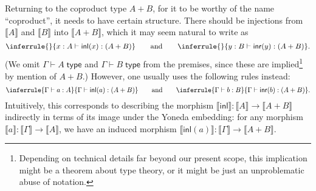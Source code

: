 \documentclass[10pt]{article}
\def\ty{\;\mathsf{type}}
\def\m#1{\llbracket#1\rrbracket}
\def\inl{\mathsf{inl}}
\def\inr{\mathsf{inr}}
\def\types{\vdash}
\numberwithin{equation}{section}
\begin{document}
Returning to the coproduct type $A+B$, for it to be worthy of the name ``coproduct'', it needs to have certain structure.
There should be injections from $\m A$ and $\m B$ into $\m {A+B}$, which %
it may seem natural to write as
\begin{equation}
  \inferrule{ }{x:A\types \inl(x) :(A+B)}
  \qquad \text{and}\qquad
  \inferrule{ }{y:B\types \inr(y) :(A+B)}.\label{eq:inl-nocut}
\end{equation}
(We omit $\Gamma \types A\ty$ and $\Gamma\types B\ty$ from the premises, since these are implied\footnote{Depending on technical details far beyond our present scope, this implication might be a theorem about type theory, or it might be just an unproblematic abuse of notation.} by mention of $A+B$.)
However, one usually uses the following rules instead:
\begin{equation}
  \inferrule{\Gamma \types a:A}{\Gamma\types \inl(a) :(A+B)}
  \qquad \text{and}\qquad
  \inferrule{\Gamma \types b:B}{\Gamma\types \inr(b) :(A+B)}.\label{eq:inl-cut}
\end{equation}
Intuitively, this corresponds to describing the morphism $\m\inl:\m A \to \m{A+B}$ indirectly in terms of its image under the Yoneda embedding: for any morphism $\m a :\m\Gamma \to \m A$, we have an induced morphism $\m {\inl(a)} :\m\Gamma \to \m {A+B}$.
\end{document}
